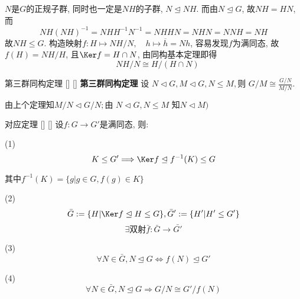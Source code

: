 \documentclass[UTF8]{ctexart}
\begin{document}
        \begin{prf}
        $N$是$G$的正规子群, 同时也一定是$NH$的子群, $N \trianglelefteq NH$.
        而由$N \trianglelefteq G$, 故$NH=HN$, 而
        \[NH(NH)^{-1}=NHH^{-1}N^{-1}=NHHN=NHN=NNH=NH\]
        故$NH\leq G$. 构造映射$f:H\mapsto NH/N,\quad h\mapsto\overline{h}=Nh$, 容易发现$f$为满同态, 故$f(H)=NH/H$, 且$\Ker f=H\cap N$, 由同构基本定理即得
        \[\quad NH/N \cong H/(H \cap N)\]
        \end{prf}

        \begin{thm}
            []
            {第三群同构定理}
            []
            []
        \textbf{第三群同构定理}
        $\text{设 }N\lhd G,M\lhd G,N\leqslant M,\text{则 }G/M\cong\frac{G/N}{M/N}.$
        \end{thm}

        \begin{prf}
            $\text{由上个定理知}M/N\lhd G/N;\text{由 }N\lhd G,N\leqslant M\text{ 知}N\lhd M)$
        \end{prf}
  
		\begin{thm}
            []
            {对应定理} 
            []
            []
            设$f:G\to G'$是满同态, 则: 
			
			(1)\[K\leq G'\Longrightarrow \Ker f\trianglelefteq f^{-1}(K)\leq G\]
			
			其中$f^{-1}(K)=\{g|g\in G, f(g)\in K\}$
			
			(2)\[\bar G:=\{H|\Ker f\trianglelefteq H\leq G\}, \bar G':=\{H'|H'\leq G'\}\]
			\[\exists\text{双射}\bar{f}: \bar{G}\to\bar{G'}\]
			
			(3)$$\forall N\in\bar G, N\trianglelefteq G\iff f(N)\trianglelefteq G'$$
			
			(4)$$\forall N\in\bar G, N\trianglelefteq G\Longrightarrow G/N\cong G'/f(N)$$
		\end{thm}
		
\end{document}
